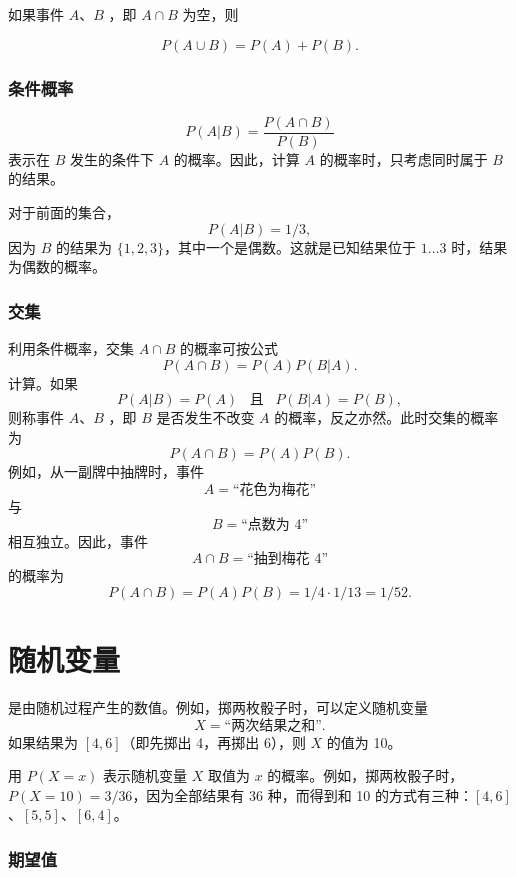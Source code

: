 如果事件 $A$、$B$ ，即 $A \cap B$ 为空，则

\[P(A \cup B)=P(A)+P(B).\]

\subsubsection{条件概率}


\[P(A | B) = \frac{P(A \cap B)}{P(B)}\]
表示在 $B$ 发生的条件下 $A$ 的概率。因此，计算 $A$ 的概率时，只考虑同时属于 $B$ 的结果。

对于前面的集合，
\[P(A | B)= 1/3,\]
因为 $B$ 的结果为 $\{1,2,3\}$，其中一个是偶数。这就是已知结果位于 $1 \ldots 3$ 时，结果为偶数的概率。

\subsubsection{交集}


利用条件概率，交集 $A \cap B$ 的概率可按公式
\[P(A \cap B)=P(A)P(B|A).\]
计算。如果
\[P(A|B)=P(A) \hspace{10pt}\textrm{且}\hspace{10pt} P(B|A)=P(B),\]
则称事件 $A$、$B$ ，即 $B$ 是否发生不改变 $A$ 的概率，反之亦然。此时交集的概率为
\[P(A \cap B)=P(A)P(B).\]
例如，从一副牌中抽牌时，事件
\[A = \textrm{“花色为梅花”}\]
与
\[B = \textrm{“点数为 4”}\]
相互独立。因此，事件
\[A \cap B = \textrm{“抽到梅花 4”}\]
的概率为
\[P(A \cap B)=P(A)P(B)=1/4 \cdot 1/13 = 1/52.\]

\section{随机变量}


是由随机过程产生的数值。例如，掷两枚骰子时，可以定义随机变量
\[X=\textrm{“两次结果之和”}.\]
如果结果为 $[4,6]$（即先掷出 4，再掷出 6），则 $X$ 的值为 10。

用 $P(X=x)$ 表示随机变量 $X$ 取值为 $x$ 的概率。例如，掷两枚骰子时，$P(X=10)=3/36$，因为全部结果有 36 种，而得到和 10 的方式有三种：$[4,6]$、$[5,5]$、$[6,4]$。

\subsubsection{期望值}

